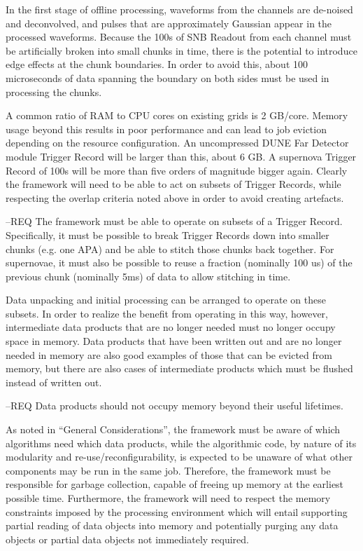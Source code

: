 \documentclass[../main-v1.tex]{subfiles}
\begin{document}
In the first stage of offline processing, waveforms from the channels are de-noised and deconvolved, and pulses that are approximately Gaussian appear in the processed waveforms. Because the 100s of SNB Readout from each channel must be artificially broken into small chunks in time, there is the potential to introduce edge effects at the chunk boundaries. In order to avoid this, about 100 microseconds of data spanning the boundary on both sides must be used in processing the chunks.

A common ratio of RAM to CPU cores on existing grids is 2 GB/core.  Memory usage beyond this results in poor performance and can lead to job eviction depending on the resource configuration.  An uncompressed DUNE Far Detector module Trigger Record will be larger than this, about 6 GB.  A supernova Trigger Record of 100s will be more than five orders of magnitude bigger again.  Clearly the framework will need to be able to act on subsets of Trigger Records, while respecting the overlap criteria noted above in order to avoid creating artefacts.

--REQ The framework must be able to operate on subsets of a Trigger Record.  Specifically, it must be possible to break Trigger Records down into smaller chunks (e.g. one APA) and be able to stitch those chunks back together.  For supernovae, it must also be possible to reuse a fraction (nominally 100 us) of the previous chunk (nominally 5ms) of data to allow stitching in time.

Data unpacking and initial processing can be arranged to operate on these subsets.  In order to realize the benefit from operating in this way, however, intermediate data products that are no longer needed must no longer occupy space in memory.  Data products that have been written out and are no longer needed in memory are also good examples of those that can be evicted from memory, but there are also cases of intermediate products which must be flushed instead of written out.

--REQ Data products should not occupy memory beyond their useful lifetimes.

As noted in “General Considerations”, the framework must be aware of which algorithms need which data products, while the algorithmic code, by nature of its modularity and re-use/reconfigurability, is expected to be unaware of what other components may be run in the same job.  Therefore, the framework must be responsible for garbage collection, capable of freeing up memory at the earliest possible time.  Furthermore, the framework will need to respect the memory constraints imposed by the processing environment which will entail supporting partial reading of data objects into memory and potentially purging any data objects or partial data objects not immediately required.
\end{document}
